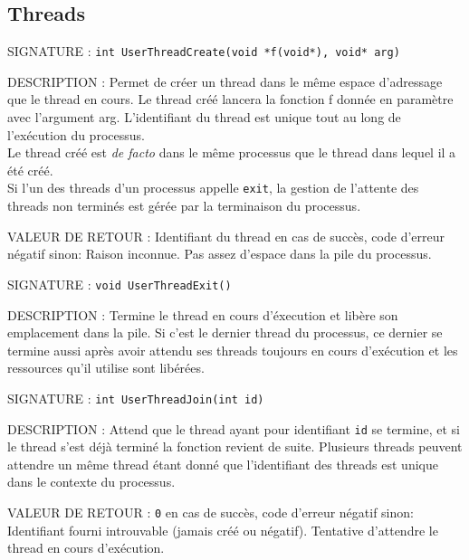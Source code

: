 \documentclass{article}
\begin{document}
	\subsection{Threads}
		\begin{description}
			\item{SIGNATURE : } \texttt{int UserThreadCreate(void *f(void*), void* arg)}
			\item{DESCRIPTION : } Permet de créer un thread dans le même espace d'adressage que le thread en cours. Le thread créé lancera la fonction f donnée en paramètre avec l'argument arg. L'identifiant du thread est unique tout au long de l'exécution du processus. \\
			Le thread créé est \emph{de facto} dans le même processus que le thread dans lequel il a été créé. \\
			Si l'un des threads d'un processus appelle \texttt{exit}, la gestion de l'attente des threads non terminés est gérée par la terminaison du processus.
			\item{VALEUR DE RETOUR : } Identifiant du thread en cas de succès, code d'erreur négatif sinon:
				 Raison inconnue.
				 Pas assez d'espace dans la pile du processus.
		\end{description}
		\vspace{2.5mm}
		\begin{description}
			\item{SIGNATURE : } \texttt{void UserThreadExit()}
			\item{DESCRIPTION : } Termine le thread en cours d'éxecution et libère son emplacement dans la pile. Si c'est le dernier thread du processus, ce dernier se termine aussi après avoir attendu ses threads toujours en cours d'exécution et les ressources qu'il utilise sont libérées.
		\end{description}
		\vspace{2.5mm}
		\begin{description}
			\item{SIGNATURE : } \texttt{int UserThreadJoin(int id)}
			\item{DESCRIPTION : } Attend que le thread ayant pour identifiant \texttt{id} se termine, et si le thread s'est déjà terminé la fonction revient de suite. Plusieurs threads peuvent attendre un même thread étant donné que l'identifiant des threads est unique dans le contexte du processus.
			\item{VALEUR DE RETOUR : } \texttt{0} en cas de succès, code d'erreur négatif sinon:
				 Identifiant fourni introuvable (jamais créé ou négatif).
				 Tentative d'attendre le thread en cours d'exécution.
		\end{description}
\end{document}
